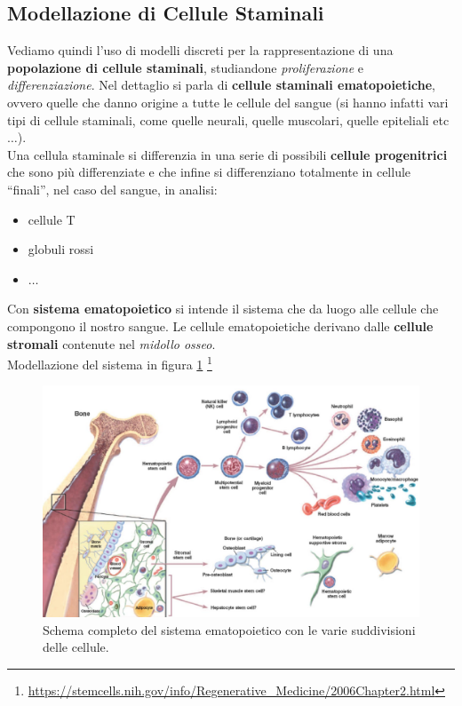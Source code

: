 \documentclass[a4paper,12pt, oneside]{book}
\begin{document}
\subsection{Modellazione di Cellule Staminali}
Vediamo quindi l'uso di modelli discreti per la rappresentazione di una
\textbf{popolazione di cellule staminali}, studiandone \textit{proliferazione}
e \textit{differenziazione}. Nel dettaglio si parla di \textbf{cellule staminali
 ematopoietiche}, ovvero quelle che danno origine a tutte le cellule del
sangue (si hanno infatti vari tipi di cellule staminali, come quelle neurali,
quelle muscolari, quelle epiteliali etc$\ldots$).\\ 
Una cellula staminale si differenzia in una serie di possibili \textbf{cellule
  progenitrici} che sono più differenziate e che infine si differenziano
totalmente in cellule ``finali'', nel caso del sangue, in analisi:
\begin{itemize}
  \item cellule T
  \item globuli rossi
  \item $\ldots$
\end{itemize}
Con \textbf{sistema ematopoietico} si intende il sistema che da luogo alle
cellule che compongono il nostro sangue. Le cellule ematopoietiche derivano
dalle \textbf{cellule stromali} contenute nel \textit{midollo osseo}.\\
Modellazione del sistema in figura \ref{fig:schema}
\footnote{\url{https://stemcells.nih.gov/info/Regenerative_Medicine/2006Chapter2.html}}
\begin{figure}
  \centering
  \includegraphics[scale = 0.18]{img/schema.jpg}
  \caption{Schema completo del sistema ematopoietico con le varie suddivisioni
    delle cellule.}
  \label{fig:schema}
\end{figure}
\end{document}
